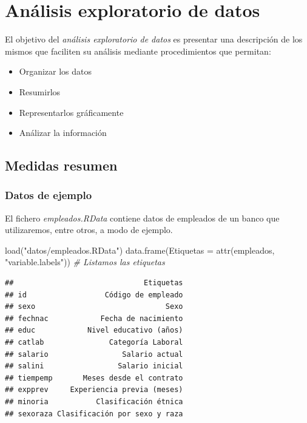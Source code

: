 \documentclass[
]{book}
\newenvironment{Shaded}{\begin{snugshade}}{\end{snugshade}}
\newcommand{\AttributeTok}[1]{\textcolor[rgb]{0.77,0.63,0.00}{#1}}
\newcommand{\CommentTok}[1]{\textcolor[rgb]{0.56,0.35,0.01}{\textit{#1}}}
\newcommand{\FunctionTok}[1]{\textcolor[rgb]{0.00,0.00,0.00}{#1}}
\newcommand{\NormalTok}[1]{#1}
\newcommand{\StringTok}[1]{\textcolor[rgb]{0.31,0.60,0.02}{#1}}
\providecommand{\tightlist}{%
  \setlength{\itemsep}{0pt}\setlength{\parskip}{0pt}}
\theoremstyle{break}
\theoremstyle{nonumberplain}
\begin{document}
\hypertarget{anuxe1lisis-exploratorio-de-datos}{%
\chapter{Análisis exploratorio de datos}\label{anuxe1lisis-exploratorio-de-datos}}

El objetivo del \emph{análisis exploratorio de datos} es presentar una descripción de los
mismos que faciliten su análisis mediante procedimientos que permitan:

\begin{itemize}
\tightlist
\item
  Organizar los datos
\item
  Resumirlos
\item
  Representarlos gráficamente
\item
  Análizar la información
\end{itemize}

\hypertarget{medidas-resumen}{%
\section{Medidas resumen}\label{medidas-resumen}}

\hypertarget{datos-de-ejemplo}{%
\subsection{Datos de ejemplo}\label{datos-de-ejemplo}}

El fichero \emph{empleados.RData} contiene datos de empleados de un banco que utilizaremos,
entre otros, a modo de ejemplo.

\begin{Shaded}
\begin{Highlighting}[]
\FunctionTok{load}\NormalTok{(}\StringTok{"datos/empleados.RData"}\NormalTok{)}
\FunctionTok{data.frame}\NormalTok{(}\AttributeTok{Etiquetas =} \FunctionTok{attr}\NormalTok{(empleados, }\StringTok{"variable.labels"}\NormalTok{))  }\CommentTok{\# Listamos las etiquetas}
\end{Highlighting}
\end{Shaded}

\begin{verbatim}
##                              Etiquetas
## id                  Código de empleado
## sexo                              Sexo
## fechnac            Fecha de nacimiento
## educ            Nivel educativo (años)
## catlab               Categoría Laboral
## salario                 Salario actual
## salini                 Salario inicial
## tiempemp       Meses desde el contrato
## expprev     Experiencia previa (meses)
## minoria           Clasificación étnica
## sexoraza Clasificación por sexo y raza
\end{verbatim}
\end{document}
